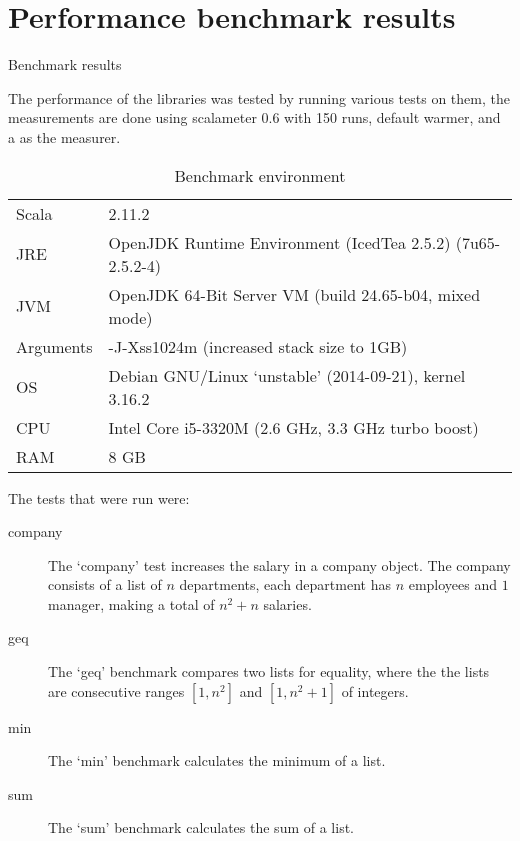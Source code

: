 \section{Performance benchmark results}

\begin{table}[ht]

\caption{Benchmark results}
\label{bench}
\end{table}

The performance of the libraries was tested by running various tests on them,
the measurements are done using scalameter 0.6 with 150 runs, default warmer,
and a  as the measurer.

\begin{table}[ht]
\begin{tabular}{l|l}
    Scala & 2.11.2 \\
    JRE   & OpenJDK Runtime Environment (IcedTea 2.5.2) (7u65-2.5.2-4) \\
    JVM   & OpenJDK 64-Bit Server VM (build 24.65-b04, mixed mode) \\
    Arguments & -J-Xss1024m (increased stack size to 1GB) \\
    OS    & Debian GNU/Linux `unstable' (2014-09-21), kernel 3.16.2 \\\hline
    CPU   & Intel Core i5-3320M (2.6 GHz, 3.3 GHz turbo boost) \\
    RAM   & 8 GB
\end{tabular}
\caption{Benchmark environment}
\end{table}

The tests that were run were:

\begin{description}
    \item[company]The `company' test increases the salary in a company
object. The company consists of a list of $n$ departments, each department has
$n$ employees and $1$ manager, making a total of $n^{2} + n$ salaries.

    \item[geq] The `geq' benchmark compares two lists for equality, where the
               the lists are consecutive ranges $[1, n^{2}]$ and $[1, n^{2} +1]$ of
               integers.

    \item[min] The `min' benchmark calculates the minimum of a list.

    \item[sum] The `sum' benchmark calculates the sum of a list.
\end{description}

